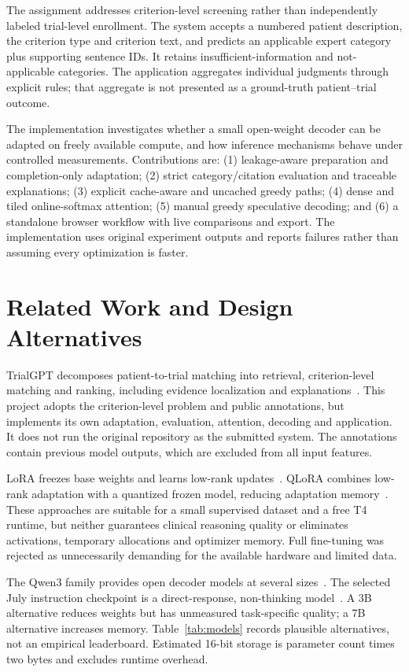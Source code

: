 \documentclass[conference]{IEEEtran}
\begin{document}
The assignment addresses criterion-level screening rather than independently labeled trial-level enrollment. The system accepts a numbered patient description, the criterion type and criterion text, and predicts an applicable expert category plus supporting sentence IDs. It retains insufficient-information and not-applicable categories. The application aggregates individual judgments through explicit rules; that aggregate is not presented as a ground-truth patient--trial outcome.

The implementation investigates whether a small open-weight decoder can be adapted on freely available compute, and how inference mechanisms behave under controlled measurements. Contributions are: (1) leakage-aware preparation and completion-only adaptation; (2) strict category/citation evaluation and traceable explanations; (3) explicit cache-aware and uncached greedy paths; (4) dense and tiled online-softmax attention; (5) manual greedy speculative decoding; and (6) a standalone browser workflow with live comparisons and export. The implementation uses original experiment outputs and reports failures rather than assuming every optimization is faster.

\section{Related Work and Design Alternatives}
TrialGPT decomposes patient-to-trial matching into retrieval, criterion-level matching and ranking, including evidence localization and explanations~\cite{trialgpt}. This project adopts the criterion-level problem and public annotations, but implements its own adaptation, evaluation, attention, decoding and application. It does not run the original repository as the submitted system. The annotations contain previous model outputs, which are excluded from all input features.

LoRA freezes base weights and learns low-rank updates~\cite{lora}. QLoRA combines low-rank adaptation with a quantized frozen model, reducing adaptation memory~\cite{qlora}. These approaches are suitable for a small supervised dataset and a free T4 runtime, but neither guarantees clinical reasoning quality or eliminates activations, temporary allocations and optimizer memory. Full fine-tuning was rejected as unnecessarily demanding for the available hardware and limited data.

The Qwen3 family provides open decoder models at several sizes~\cite{qwenreport}. The selected July instruction checkpoint is a direct-response, non-thinking model~\cite{qwen4}. A 3B alternative reduces weights but has unmeasured task-specific quality; a 7B alternative increases memory. Table~\ref{tab:models} records plausible alternatives, not an empirical leaderboard. Estimated 16-bit storage is parameter count times two bytes and excludes runtime overhead.
\end{document}
